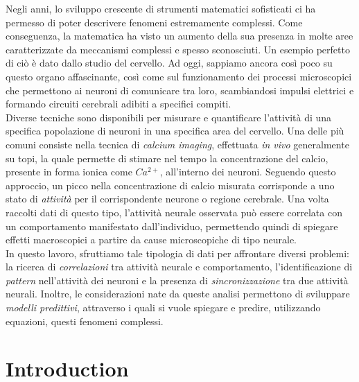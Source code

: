 \documentclass[12pt, a4paper]{report}
\begin{document}
Negli anni, lo sviluppo crescente di strumenti matematici sofisticati ci ha permesso di poter descrivere fenomeni estremamente complessi. Come conseguenza, la matematica ha visto un aumento della sua presenza in molte aree caratterizzate da meccanismi complessi e spesso sconosciuti. Un esempio perfetto di ciò è dato dallo studio del cervello. Ad oggi, sappiamo ancora così poco su questo organo affascinante, così come sul funzionamento dei processi microscopici che permettono ai neuroni di comunicare tra loro, scambiandosi impulsi elettrici e formando circuiti cerebrali adibiti a specifici compiti.\\
Diverse tecniche sono disponibili per misurare e quantificare l'attività di una specifica popolazione di neuroni in una specifica area del cervello. Una delle più comuni consiste nella tecnica di \textit{calcium imaging}, effettuata \textit{in vivo} generalmente su topi, la quale permette di stimare nel tempo la concentrazione del calcio, presente in forma ionica come  $Ca^{2+}$, all'interno dei neuroni. Seguendo questo approccio, un picco nella concentrazione di calcio misurata corrisponde a uno stato di \textit{attività} per il corrispondente neurone o regione cerebrale. Una volta raccolti dati di questo tipo, l'attività neurale osservata può essere correlata con un comportamento manifestato dall'individuo, permettendo quindi di spiegare effetti macroscopici a partire da cause microscopiche di tipo neurale.\\
In questo lavoro, sfruttiamo tale tipologia di dati per affrontare diversi problemi: la ricerca di \textit{correlazioni} tra attività neurale e comportamento, l'identificazione di \textit{pattern} nell'attività dei neuroni e la presenza di \textit{sincronizzazione} tra due attività neurali. Inoltre, le considerazioni nate da queste analisi permettono di sviluppare \textit{modelli predittivi}, attraverso i quali si vuole spiegare e predire, utilizzando equazioni, questi fenomeni complessi.	
		
	\chapter*{Introduction}
\end{document}
